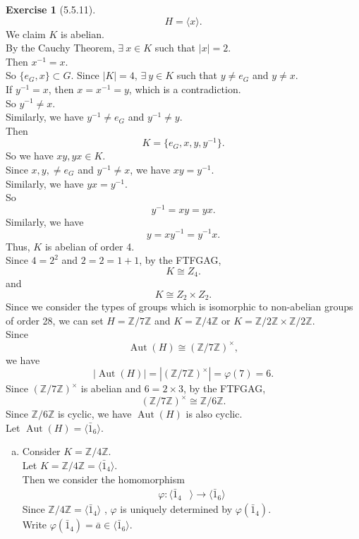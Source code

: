 \documentclass{amsart}
\newcommand{\bbz}{\mathbb{Z}}
\theoremstyle{plain}
\theoremstyle{definition}
\newtheorem{exer}[lem]{Exercise}
\begin{document}
\begin{exer}[5.5.11]
\[H = \langle x \rangle.\]
We claim $K$ is abelian.\\
By the Cauchy Theorem, $\exists\ x \in K$ such that $|x| = 2$.\\
Then $x^{-1} = x$.\\
So $\{e_G,x\} \subset G$.
Since $|K|  =4$, $\exists \ y \in K$ such that $y\neq e_G$ and $y\neq x$.\\
If $y^{-1} = x$, then $x = x^{-1} = y$, which is a contradiction.\\
So $y^{-1} \neq x$.\\
Similarly, we have $y^{-1}\neq e_G$ and $y^{-1} \neq y$.\\
Then 
\[K =\{e_G,x,y,y^{-1}\}.\] 
So we have $xy, yx\in K$.\\
Since $x,y,\neq e_G$ and $y^{-1} \neq x$, we have $xy = y^{-1}$.\\
Similarly, we have $yx = y^{-1}$. \\
So 
\[y^{-1}= xy = yx.\]
Similarly, we have 
\[y=xy^{-1} = y^{-1}x .\]
Thus, $K$ is abelian of order 4.\\
Since $4 = 2^2$ and $2=2=1+1$, by the FTFGAG,
\[K \cong Z_4.\]
and \[K \cong Z_2 \times Z_2.\]
Since we consider the types of groups which is isomorphic to non-abelian groups of order 28, we can set $H = \bbz/7\bbz$ and $K = \bbz/4\bbz$ or $K= \bbz/2\bbz \times \bbz/2\bbz$. \\
Since 
\[\operatorname{Aut}(H) \cong (\bbz /7\bbz)^{\times},\]
we have
\[|\operatorname{Aut}(H)| = |(\bbz /7\bbz)^{\times}| = \varphi(7)=6.\]
Since $(\bbz /7\bbz)^{\times}$ is abelian and $6 = 2\times 3$, by the FTFGAG,
\[(\bbz /7\bbz)^{\times} \cong \bbz/6\bbz.\]
Since $\bbz/6\bbz$ is cyclic, we have $\operatorname{Aut}(H)$ is also cyclic.\\
Let $\operatorname{Aut}(H) = \langle \bar{1}_6 \rangle$.
\begin{enumerate}[(a)]
	\item Consider $K=\bbz/4\bbz$.\\
	  Let $K=\bbz/4\bbz = \langle \bar{1}_4 \rangle$.\\
	  Then we consider the homomorphism 
	  \begin{align*}
		\varphi: \langle \bar{1}_4& \rangle \to \langle \bar{1}_6 \rangle 
  	  \end{align*}
	  Since $\bbz/4\bbz = \langle \bar{1}_4 \rangle$ , $\varphi$ is uniquely determined by $\varphi(\bar{1}_4)$.\\
	  Write $\varphi(\bar{1}_4) = \bar{a} \in \langle \bar{1}_6 \rangle$.\\

\end{enumerate}
\end{exer}
\end{document}
